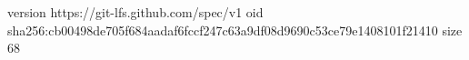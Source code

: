 version https://git-lfs.github.com/spec/v1
oid sha256:cb00498de705f684aadaf6fccf247c63a9df08d9690c53ce79e1408101f21410
size 68

